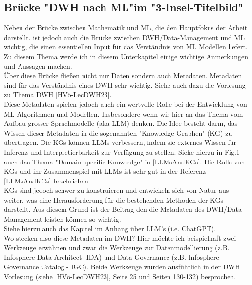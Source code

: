 \documentclass[12pt]{article}
\begin{document}
\subsection{Brücke "DWH nach ML"im "3-Insel-Titelbild"}
Neben der Brücke zwischen Mathematik und ML, die den Hauptfokus der Arbeit darstellt, ist jedoch auch die Brücke zwischen DWH/Data-Management und ML wichtig, die einen essentiellen Input für das Verständnis von ML Modellen liefert. Zu diesem Thema werde ich in diesem  Unterkapitel einige wichtige Anmerkungen und Aussagen machen.\\[0.1cm]
Über diese Brücke fließen nicht nur Daten sondern auch Metadaten. Metadaten sind für das Verständnis eines DWH sehr wichtig. Siehe auch dazu die Vorlesung zu Thema DWH [HVö-LecDWH23].\\
Diese Metadaten spielen jedoch auch ein wertvolle Rolle bei der Entwicklung von ML Algorithmen und Modellen. Insbesondere wenn wir hier an das Thema vom Aufbau grosser Sprachmodelle (aka LLM) denken. Die Idee besteht darin, das Wissen dieser Metadaten in die sogenannten "Knowledge Graphen" (KG) zu übertragen. Die KGs können LLMs verbessern, indem sie externes Wissen für Inferenz und Interpretierbarkeit zur Verfügung zu stellen. Siehe hierzu in Fig.1 auch das Thema "Domain-specific Knowledge" in [LLMsAndKGs]. Die Rolle von KGs und ihr Zusammenspiel mit LLMs ist sehr gut in der Referenz [LLMsAndKGs] beschrieben.\\
KGs sind jedoch schwer zu konstruieren und entwickeln sich von Natur aus weiter, was eine Herausforderung für die bestehenden Methoden der KGs darstellt. Aus diesem Grund ist der Beitrag den die Metadaten des DWH/Data-Management leisten können so wichtig. \\
Siehe hierzu auch das Kapitel im Anhang über LLM's (i.e. ChatGPT).
\\[0.2cm] 
%
Wo stecken also diese Metadaten im DWH? Hier möchte ich beispielhaft zwei Werkzeuge erwähnen und zwar die Werkzeuge zur Datenmodellierung (z.B. Infosphere Data Architect -IDA) und Data Governance (z.B. Infosphere Governance Catalog - IGC). Beide Werkzeuge wurden ausführlich in der DWH Vorlesung (siehe [HVö-LecDWH23], Seite 25 und Seiten 130-132) besprochen. \\[0.1cm] 
\end{document}
